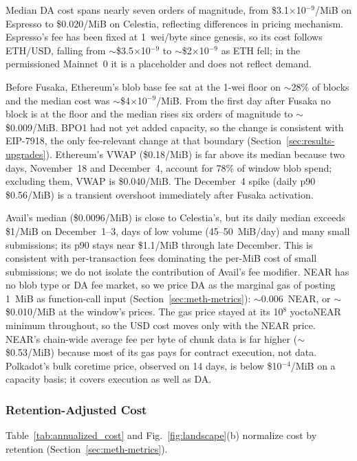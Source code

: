 Median DA cost spans nearly seven orders of magnitude, from \$3.1$\times$10$^{-9}$/MiB on Espresso to \$0.020/MiB on Celestia, reflecting differences in pricing mechanism.
Espresso's fee has been fixed at 1~wei/byte since genesis, so its cost follows ETH/USD, falling from $\sim$\$3.5$\times$10$^{-9}$ to $\sim$\$2$\times$10$^{-9}$ as ETH fell; in the permissioned Mainnet~0 it is a placeholder and does not reflect demand.

Before Fusaka, Ethereum's blob base fee sat at the 1-wei floor on $\sim$28\% of blocks and the median cost was $\sim$\$4$\times$10$^{-9}$/MiB.
From the first day after Fusaka no block is at the floor and the median rises six orders of magnitude to $\sim$\$0.009/MiB.
BPO1 had not yet added capacity, so the change is consistent with EIP-7918, the only fee-relevant change at that boundary (Section~\ref{sec:results-upgrades}).
Ethereum's VWAP (\$0.18/MiB) is far above its median because two days, November~18 and December~4, account for 78\% of window blob spend; excluding them, VWAP is \$0.040/MiB. The December~4 spike (daily p90 \$0.56/MiB) is a transient overshoot immediately after Fusaka activation.

Avail's median (\$0.0096/MiB) is close to Celestia's, but its daily median exceeds \$1/MiB on December~1--3, days of low volume (45--50~MiB/day) and many small submissions; its p90 stays near \$1.1/MiB through late December. This is consistent with per-transaction fees dominating the per-MiB cost of small submissions; we do not isolate the contribution of Avail's fee modifier.
NEAR has no blob type or DA fee market, so we price DA as the marginal gas of posting 1~MiB as function-call input (Section~\ref{sec:meth-metrics}): $\sim$0.006~NEAR, or $\sim$\$0.010/MiB at the window's prices. The gas price stayed at its 10$^{8}$ yoctoNEAR minimum throughout, so the USD cost moves only with the NEAR price. NEAR's chain-wide average fee per byte of chunk data is far higher ($\sim$\$0.53/MiB) because most of its gas pays for contract execution, not data.
Polkadot's bulk coretime price, observed on 14 days, is below \$10$^{-4}$/MiB on a capacity basis; it covers execution as well as DA.

\subsubsection{Retention-Adjusted Cost}
Table~\ref{tab:annualized_cost} and Fig.~\ref{fig:landscape}(b) normalize cost by retention (Section~\ref{sec:meth-metrics}).

